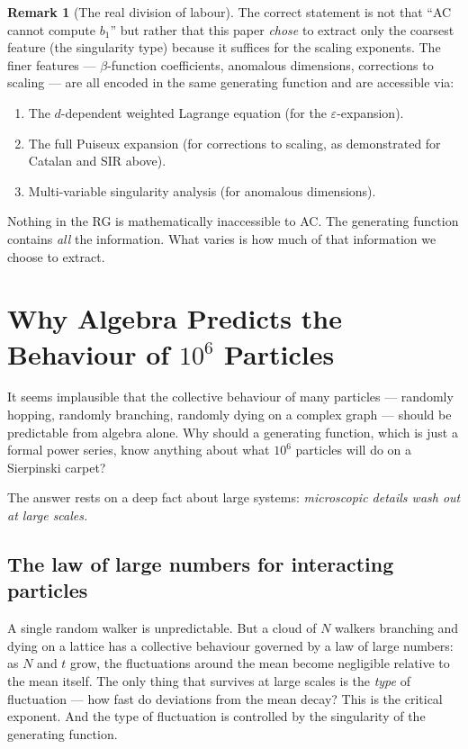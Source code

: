\documentclass[11pt,a4paper]{article}
\theoremstyle{definition}
\newtheorem*{remark}{Remark}
\begin{document}
\begin{remark}[The real division of labour]
The correct statement is not that ``AC cannot compute $b_1$'' but rather
that this paper \emph{chose} to extract only the coarsest feature
(the singularity type) because it suffices for the scaling exponents.
The finer features --- $\beta$-function coefficients, anomalous
dimensions, corrections to scaling --- are all encoded in the same
generating function and are accessible via:
\begin{enumerate}
\item The $d$-dependent weighted Lagrange equation (for the
      $\varepsilon$-expansion).
\item The full Puiseux expansion (for corrections to scaling, as
      demonstrated for Catalan and SIR above).
\item Multi-variable singularity analysis (for anomalous dimensions).
\end{enumerate}
Nothing in the RG is mathematically inaccessible to AC. The generating
function contains \emph{all} the information. What varies is how much
of that information we choose to extract.
\end{remark}

\section{Why Algebra Predicts the Behaviour of $10^6$ Particles}
\label{app:why_it_works}

It seems implausible that the collective behaviour of many particles
--- randomly hopping, randomly branching, randomly dying on a complex
graph --- should be predictable from algebra alone. Why should a
generating function, which is just a formal power series, know anything
about what $10^6$ particles will do on a Sierpinski carpet?

The answer rests on a deep fact about large systems:
\emph{microscopic details wash out at large scales.}

\subsection{The law of large numbers for interacting particles}

A single random walker is unpredictable. But a cloud of $N$ walkers
branching and dying on a lattice has a collective behaviour governed
by a law of large numbers: as $N$ and $t$ grow, the fluctuations
around the mean become negligible relative to the mean itself. The
only thing that survives at large scales is the \emph{type} of
fluctuation --- how fast do deviations from the mean decay? This is
the critical exponent. And the type of fluctuation is controlled by
the singularity of the generating function.
\end{document}
